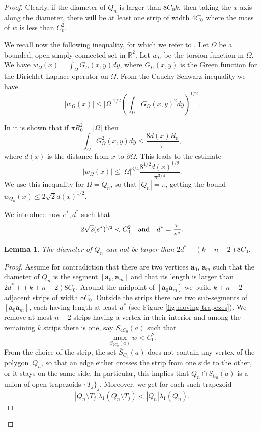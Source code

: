 \documentclass[JEP,XML,SOM,Unicode,ThmDefs,NoFloatCountersInSection,published]{cedram}
\theoremstyle{plain}
\newtheorem{lemma}[thm]{Lemma}
\theoremstyle{definition}
\newcommand{\bo}[1]{{\boldsymbol#1}}
\def\R{\mathbb{R}}
\newcommand{\Om}{\Omega}
\newcommand{\lb}{\lambda}
\newcommand{\sm}{\setminus}
\newcommand{\ov}{\overline}
\begin{document}
\begin{proof}
Clearly, if the diameter of $Q_n$ is larger than $8C_0k$, then taking the $x$-axis along the diameter, there will be at least one strip of width $4 C_0$ where the mass of $w$ is less than $C_0^2$.

We recall now the following inequality, for which we refer to \cite{BoVdB99}. Let $\Om$ be a bounded, open simply connected set in $\R^2$.
Let $w_\Om$ be the torsion function in $\Omega$.
We have
$w_\Om(x) = \int_\Omega G_\Omega(x,y)dy$, where $G_\Omega(x,y)$ is the Green function for the Dirichlet-Laplace operator on $\Omega$. From the Cauchy-Schwarz inequality we have
\[
|w_\Om(x)| \leq |\Omega|^{1/2} \left(\int_\Omega G_\Omega (x,y)^2dy\right)^{1/2}.
\]

In \cite[Proof of Th.\,1.5, Ineq.\,(5.16)]{BoVdB99} it is shown that if $\pi R_0^2=|\Omega|$ then
\[
\int_\Omega G_\Omega^2(x,y)dy \leq \frac{8 d(x)R_0}{\pi},
\]
where $d(x)$ is the distance from $x$ to $\partial \Omega$. This leads to the estimate
\begin{equation}\label{bb64.5}
|w_\Om(x)|\leq |\Omega|^{3/4}\frac{8^{1/2}d(x)^{1/2}}{\pi^{3/4}}.
\end{equation}
We use this inequality for $\Om=Q_n$, so that $|Q_n|=\pi$, getting the bound $w_{Q_n}(x) \le 2 \sqrt{2} d(x)^{1/2}$.

We introduce now $e^*, d^*$ such that
\begin{equation}\label{bb64.6}
2\sqrt{2} (e^*)^{\sfrac 12}< C_0^2\quad \mbox{and} \quad d^*=\frac{\pi}{e^*}.
\end{equation}

\begin{lemma}\label{bb64}
The diameter of $Q_n$ can not be larger than $2 d^* + (k+n-2)8 C_0$.
\end{lemma}

\begin{proof}
Assume for contradiction that there are two vertices $\bo a_0$, $\bo a_m$ such that the diameter of $Q_n$ is the segment $[\bo a_0, \bo a_m]$ and that its length is larger than $2 d^* + { (k+n-2)8 C_0} $.
{Around the midpoint of $[\bo a_0 \bo a_m]$ we build $k+n-2$ adjacent strips of width $8 C_0$. Outside the strips there are two sub-segments of $[\bo a_0 \bo a_m]$, each having length at least $d^*$ (see Figure \ref{fig:moving-trapezes}}). We remove at most $n-2$ strips having a vertex in their interior and among the remaining $k$ strips there is one, say $S_{4C_0}(a)$ such that
\[
\max _{S_{2C_0}(a)} w <C_0^2.
\]
From the choice of the strip, the set $\ov S_{C_0}(a)$ does not contain any vertex of the polygon~$Q_n$, so that an edge either crosses the strip from one side to the other, or it stays on the same side. In particular, this implies that $Q_n\cap S_{C_0}(a)$ is a union of open {trapezoids} $\{T_j\}_j$. Moreover, we get for each such {trapezoid}
\[
|Q_n\sm \ov T_j|\lb_1(Q_n\sm \ov T_j) < |Q_n| \lb_1(Q_n).
\]


\end{proof}
\end{proof}
\end{document}
